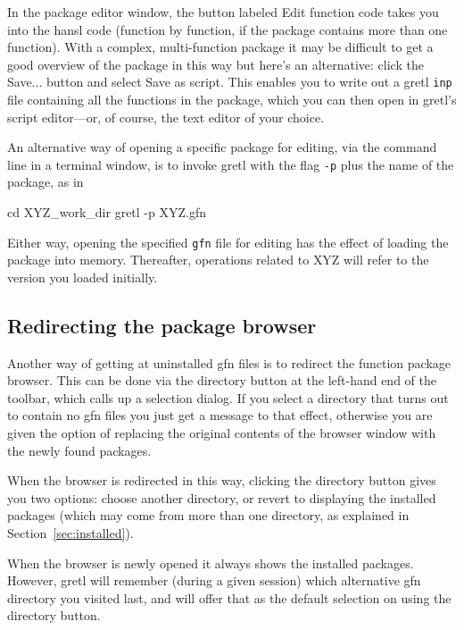 \documentclass[oneside]{book}
\begin{document}
In the package editor window, the button labeled \textsf{Edit function
  code} takes you into the hansl code (function by function, if the
package contains more than one function). With a complex,
multi-function package it may be difficult to get a good overview of
the package in this way but here's an alternative: click the
\textsf{Save...} button and select \textsf{Save as script}. This
enables you to write out a gretl \texttt{inp} file containing all the
functions in the package, which you can then open in gretl's script
editor---or, of course, the text editor of your choice.

An alternative way of opening a specific package for editing, via the
command line in a terminal window, is to invoke gretl with the flag
\texttt{-p} plus the name of the package, as in
%
\begin{code}
cd XYZ_work_dir
gretl -p XYZ.gfn
\end{code}
%
Either way, opening the specified \texttt{gfn} file for editing has
the effect of loading the package into memory. Thereafter, operations
related to \textsf{XYZ} will refer to the version you loaded
initially.

\subsection{Redirecting the package browser}

Another way of getting at uninstalled \textsf{gfn} files is to
redirect the function package browser. This can be done via the
directory button at the left-hand end of the toolbar, which calls up a
selection dialog. If you select a directory that turns out to contain
no \textsf{gfn} files you just get a message to that effect, otherwise
you are given the option of replacing the original contents of the
browser window with the newly found packages.

When the browser is redirected in this way, clicking the directory
button gives you two options: choose another directory, or revert to
displaying the installed packages (which may come from more than one
directory, as explained in Section~\ref{sec:installed}).

When the browser is newly opened it always shows the installed
packages. However, gretl will remember (during a given session) which
alternative \textsf{gfn} directory you visited last, and will offer
that as the default selection on using the directory button.

\end{document}
